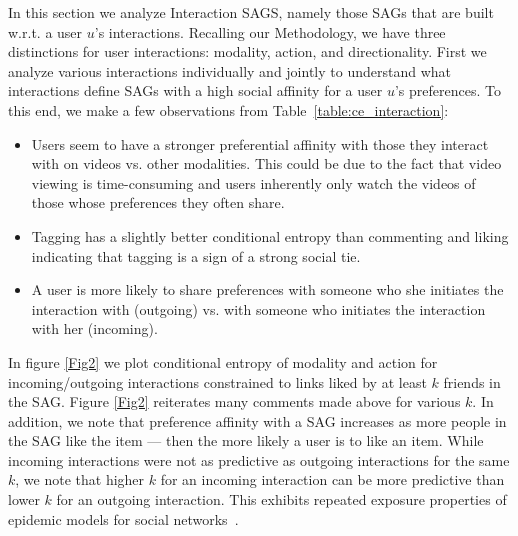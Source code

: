 In this section we analyze Interaction SAGS, namely those SAGs that
are built w.r.t. a user $u$'s interactions.  Recalling our Methodology,
we have three distinctions for user interactions: modality, action,
and directionality.  First we analyze various interactions individually
and jointly to understand what interactions define SAGs with a high
social affinity for a user $u$'s preferences.  To this end, we make a few
observations from Table~\ref{table:ce_interaction}: 
\begin{itemize}
\item Users seem to have a stronger preferential affinity with
those they interact with on videos vs. other modalities.  This could
be due to the fact that video viewing is time-consuming and users
inherently only watch the videos of those whose preferences they
often share.
\item Tagging has a slightly better conditional entropy than commenting
and liking indicating that tagging is a sign of a strong social tie.~\cite{***}
\item A user is more likely to share preferences with someone who she
initiates the interaction with (outgoing) vs. with someone who initiates
the interaction with her (incoming).~\cite{saez2011high}
\end{itemize}

In figure \ref{Fig2} we plot conditional entropy of modality and
action for incoming/outgoing interactions constrained to links
liked by at least $k$ friends in the SAG.  Figure \ref{Fig2} reiterates
many comments made above for various $k$.  In addition, we note that
preference affinity with a SAG increases as more people in the SAG
like the item --- then the more likely a user is to like an item.
While incoming interactions were not as predictive as outgoing
interactions for the same $k$, we note that higher $k$ for an incoming
interaction can be more predictive than lower $k$ for an outgoing
interaction.  This exhibits repeated exposure properties of epidemic
models for social networks~\cite{Golub2010selectionbiase}.


